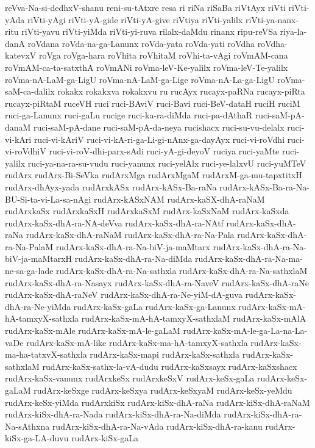 {reVva-Na-si-dedhxV-shanu
reni-su-tAtxre
resa
ri
riNa
riSaBa
riVtAyx
riVti
riVti-yAda
riVti-yAgi
riVti-yA-gide
riVti-yA-give
riVtiya
riVti-yalilx
riVti-ya-nanx-ritu
riVti-yavu
riVti-yiMda
riVti-yi-ruva
rilalx-daMdu
rinanx
ripu-reVSa
riya-la-danA
roVdana
roVda-na-ga-Lanunx
roVda-yata
roVda-yati
roVdha
roVdha-katevxV
roVga
roVga-hara
roVhita
roVhitaM
roVhi-ta-vAgi
roVmAM-cana
roVmAM-ca-ta-satxthA
roVmANi
roVma-leV-Ke-yalilx
roVma-leV-Te-yalilx
roVma-nA-LaM-ga-LigU
roVma-nA-LaM-ga-Lige
roVma-nA-La-ga-LigU
roVma-saM-ca-dalilx
rokakx
rokakxva
rokakxvu
ru
rucAyx
rucayx-paRNa
rucayx-piRta
rucayx-piRtaM
ruceVH
ruci
ruci-BAviV
ruci-Bavi
ruci-BeV-dataH
ruciH
ruciM
ruci-ga-Lanunx
ruci-gaLu
rucige
ruci-ka-ra-diMda
ruci-pa-dAthaR
ruci-saM-pA-danaM
ruci-saM-pA-dane
ruci-saM-pA-da-neya
rucishacx
ruci-su-vu-delalx
ruci-vi-kAri
ruci-vi-kAriV
ruci-vi-kA-ri-ga-Li-gi-nAnx-ga-dayAyx
ruci-vi-roVdhi
ruci-vi-roVdhiV
ruci-vi-roV-dhi-parx-sAdi
ruci-yA-gi-deyoV
ruciya
ruci-yaMte
ruci-yalilx
ruci-ya-na-ra-su-vudu
ruci-yanunx
ruci-yelAlx
ruci-ye-lalxvU
ruci-yuMTeV
rudArx
rudArx-Bi-SeVka
rudArxMga
rudArxMgaM
rudArxM-ga-mu-tapxtitxH
rudArx-dhAyx-yada
rudArxkASx
rudArx-kASx-Ba-raNa
rudArx-kASx-Ba-ra-Na-BU-Si-ta-vi-La-sa-nAgi
rudArx-kASxNAM
rudArx-kaSX-dhA-raNaM
rudArxkaSx
rudArxkaSxH
rudArxkaSxM
rudArx-kaSxNaM
rudArx-kaSxda
rudArx-kaSx-dhA-ra-NA-deVva
rudArx-kaSx-dhA-ra-NAtf
rudArx-kaSx-dhA-raNa
rudArx-kaSx-dhA-raNaM
rudArx-kaSx-dhA-ra-Na-Pala
rudArx-kaSx-dhA-ra-Na-PalaM
rudArx-kaSx-dhA-ra-Na-biV-ja-maMtarx
rudArx-kaSx-dhA-ra-Na-biV-ja-maMtarxH
rudArx-kaSx-dhA-ra-Na-diMda
rudArx-kaSx-dhA-ra-Na-ma-ne-sa-ga-lade
rudArx-kaSx-dhA-ra-Na-sathxla
rudArx-kaSx-dhA-ra-Na-sathxlaM
rudArx-kaSx-dhA-ra-Nasayx
rudArx-kaSx-dhA-ra-NaveV
rudArx-kaSx-dhA-raNe
rudArx-kaSx-dhA-raNeV
rudArx-kaSx-dhA-ra-Ne-yiM-dA-guva
rudArx-kaSx-dhA-ra-Ne-yiMda
rudArx-kaSx-gaLa
rudArx-kaSx-ga-Lanunx
rudArx-kaSx-mA-hA-tamxyX-sathxla
rudArx-kaSx-mA-hA-tamxyX-sathxlaM
rudArx-kaSx-mAlA
rudArx-kaSx-mAle
rudArx-kaSx-mA-le-gaLaM
rudArx-kaSx-mA-le-ga-La-na-La-vaDe
rudArx-kaSx-mA-like
rudArx-kaSx-ma-hA-tamxyX-sathxla
rudArx-kaSx-ma-ha-tatxvX-sathxla
rudArx-kaSx-mapi
rudArx-kaSx-sathxla
rudArx-kaSx-sathxlaM
rudArx-kaSx-sathx-la-vA-dudu
rudArx-kaSxsayx
rudArx-kaSxshacx
rudArx-kaSx-vanunx
rudArxkeSx
rudArxkeSxV
rudArx-keSx-gaLa
rudArx-keSx-gaLaM
rudArx-keSxge
rudArx-keSxya
rudArx-keSxyaM
rudArx-keSx-yeMdu
rudArx-keSx-yiMda
rudArxkiSx
rudArx-kiSx-dhA-raNa
rudArx-kiSx-dhA-raNaM
rudArx-kiSx-dhA-ra-Nada
rudArx-kiSx-dhA-ra-Na-diMda
rudArx-kiSx-dhA-ra-Na-sAthxna
rudArx-kiSx-dhA-ra-Na-vAda
rudArx-kiSx-dhA-ra-kanu
rudArx-kiSx-ga-LA-duvu
rudArx-kiSx-gaLa
}
